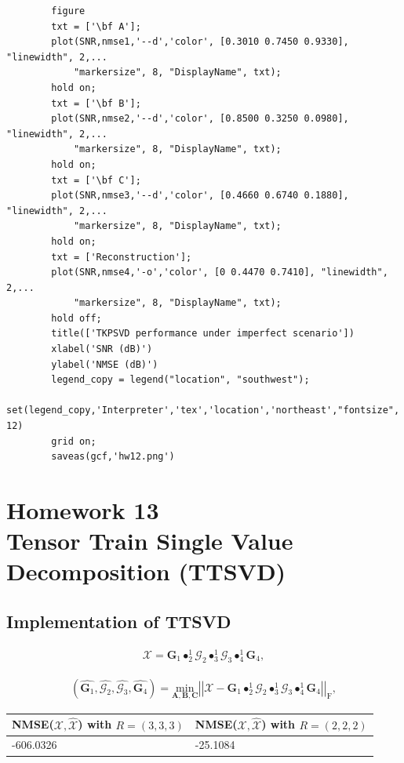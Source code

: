 \documentclass[a4paper,10pt]{article}
\begin{document}
\begin{verbatim}
        figure
        txt = ['\bf A'];
        plot(SNR,nmse1,'--d','color', [0.3010 0.7450 0.9330], "linewidth", 2,...
            "markersize", 8, "DisplayName", txt);
        hold on;
        txt = ['\bf B'];
        plot(SNR,nmse2,'--d','color', [0.8500 0.3250 0.0980], "linewidth", 2,...
            "markersize", 8, "DisplayName", txt);
        hold on;
        txt = ['\bf C'];
        plot(SNR,nmse3,'--d','color', [0.4660 0.6740 0.1880], "linewidth", 2,...
            "markersize", 8, "DisplayName", txt);
        hold on;
        txt = ['Reconstruction'];
        plot(SNR,nmse4,'-o','color', [0 0.4470 0.7410], "linewidth", 2,...
            "markersize", 8, "DisplayName", txt);
        hold off;
        title(['TKPSVD performance under imperfect scenario'])
        xlabel('SNR (dB)')
        ylabel('NMSE (dB)')
        legend_copy = legend("location", "southwest");
        set(legend_copy,'Interpreter','tex','location','northeast',"fontsize", 12)
        grid on;
        saveas(gcf,'hw12.png')
    \end{verbatim}
    
\newpage
\section*{Homework 13 \\ Tensor Train Single Value Decomposition (TTSVD)}

    \subsection*{Implementation of TTSVD}
        
    \begin{align}
        \mathcal{X} = \boldsymbol{G}_{1} \bullet^{1}_{2} \mathcal{G}_{2} \bullet^{1}_{3} \mathcal{G}_{3} \bullet^{1}_{4} \boldsymbol{G}_{4},
    \end{align}

    \begin{align}
        \left(\hat{\boldsymbol{G}_{1}}, \hat{\mathcal{G}_{2}}, \hat{\mathcal{G}_{3}}, \hat{\boldsymbol{G}_{4}}\right) = \underset{\boldsymbol{A}, \boldsymbol{B}, \boldsymbol{C}}{\text{min}} \left| \left| \mathcal{X} - \boldsymbol{G}_{1} \bullet^{1}_{2} \mathcal{G}_{2} \bullet^{1}_{3} \mathcal{G}_{3} \bullet^{1}_{4} \boldsymbol{G}_{4} \right| \right|_{\text{F}},
    \end{align}

    \begin{table}[ht!]
        \centering
        \begin{tabular}{|l|l|}
        \hline
        NMSE($\mathcal{X}, \mathcal{\hat{X}}$) with $R = (3,3,3)$ & NMSE($\mathcal{X}, \mathcal{\hat{X}}$) with $R = (2,2,2)$ \\ \hline 
        -606.0326 & -25.1084 \\ \hline
        \end{tabular}
    \end{table}
\end{document}
